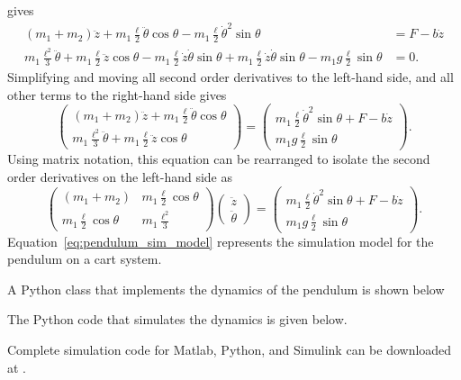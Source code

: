 gives
\begin{align*}
(m_1+m_2)\ddot{z} + m_1 \frac{\ell}{2} \ddot{\theta}\cos\theta - m_1 \frac{\ell}{2} \dot{\theta}^2\sin\theta &= F - b\dot{z} \\
m_1 \frac{\ell^2}{3} \ddot{\theta} + m_1 \frac{\ell}{2} \ddot{z}\cos\theta - m_1 \frac{\ell}{2} \dot{z}\dot{\theta}\sin\theta + m_1\frac{\ell}{2}\dot{z}\dot{\theta}\sin\theta - m_1 g \frac{\ell}{2} \sin\theta &= 0.
\end{align*}
Simplifying and moving all second order derivatives to the left-hand side, and all other terms to the right-hand side gives
\[
\begin{pmatrix}
(m_1+m_2)\ddot{z} + m_1 \frac{\ell}{2} \ddot{\theta}\cos\theta  \\
m_1 \frac{\ell^2}{3} \ddot{\theta} + m_1 \frac{\ell}{2} \ddot{z}\cos\theta   
\end{pmatrix}
= \begin{pmatrix}  m_1 \frac{\ell}{2} \dot{\theta}^2\sin\theta + F -b\dot{z} \\ m_1 g \frac{\ell}{2} \sin\theta \end{pmatrix}.
\]
Using matrix notation, this equation can be rearranged to isolate the second order derivatives on the left-hand side as
\begin{equation}\label{eq:pendulum_sim_model}
\begin{pmatrix}
(m_1+m_2) & m_1 \frac{\ell}{2} \cos\theta \\ 
m_1 \frac{\ell}{2} \cos\theta & m_1 \frac{\ell^2}{3}
\end{pmatrix} \begin{pmatrix}\ddot{z} \\ \ddot{\theta} \end{pmatrix}
= \begin{pmatrix}  m_1 \frac{\ell}{2} \dot{\theta}^2\sin\theta + F -b\dot{z} \\ m_1 g \frac{\ell}{2} \sin\theta \end{pmatrix}.
\end{equation}
Equation~\eqref{eq:pendulum_sim_model} represents the simulation model for the pendulum on a cart system.

A Python class that implements the dynamics of the pendulum is shown below


The Python code that simulates the dynamics is given below.


Complete simulation code for Matlab, Python, and Simulink can be downloaded at .



